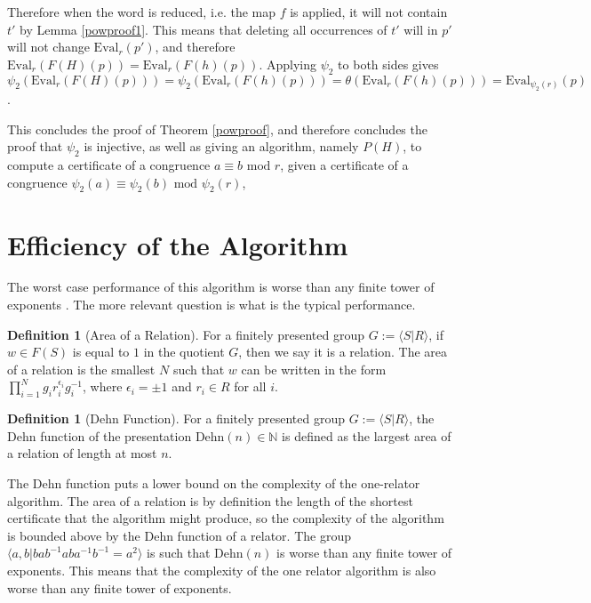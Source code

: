 \documentclass[12pt]{article} %
\theoremstyle{definition}
\theoremstyle{definition}
\theoremstyle{definition}
\theoremstyle{definition}
\newtheorem{defn}[thm]{Definition}
\begin{document}
Therefore when the word is reduced, i.e. the map $f$ is applied,
it will not contain $t'$ by Lemma \ref{powproof1}. This means that deleting all occurrences of
$t'$ will in $p'$ will not change $\text{Eval}_r(p')$, and therefore
$\text{Eval}_r(F(H)(p)) = \text{Eval}_r(F(h)(p))$.
Applying $\psi_2$ to both sides gives
$\psi_2(\text{Eval}_r(F(H)(p))) =
  \psi_2(\text{Eval}_r(F(h)(p))) =
  \theta(\text{Eval}_r(F(h)(p))) =
  \text{Eval}_{\psi_2(r)}(p)$.

  This concludes the proof of Theorem \ref{powproof}, and therefore concludes the proof
  that $\psi_2$ is injective, as well as giving an algorithm, namely $P(H)$,
  to compute a certificate of a congruence $a \equiv b \text{ mod } r$,
  given a certificate of a congruence  $\psi_2(a) \equiv \psi_2(b) \text{ mod } \psi_2(r)$,

\section{Efficiency of the Algorithm}

  The worst case performance of this algorithm is worse than any finite tower of exponents
  \cite{MYASNIKOV2011324}. The more relevant question is what is the typical performance.

  \begin{defn}[Area of a Relation]
  For a finitely presented group $G := \langle S | R\rangle$, if $w \in F(S)$ is equal
  to $1$ in the quotient $G$, then we say it is a relation.
  The area of a relation is the smallest $N$ such that $w$ can be written
  in the form $\prod_{i=1}^N g_i r_i^{\epsilon_i} g_i^{-1}$, where $\epsilon_i = \pm 1$
  and $r_i \in R$ for all $i$.
  \end{defn}

  \begin{defn}[Dehn Function]
  For a finitely presented group $G := \langle S | R\rangle$, the Dehn function
  of the presentation $\text{Dehn}(n) \in \mathbb{N}$ is defined as the
  largest area of a relation of length at most $n$.
  \end{defn}

  The Dehn function puts a lower bound on the complexity of the one-relator algorithm.
  The area of a relation is by definition the length of the shortest certificate
  that the algorithm might produce, so the complexity of the algorithm is bounded above by
  the Dehn function of a relator.
  The group $\langle a, b | b a b^{-1} a b a^{-1} b^{-1} = a^2\rangle$ is such that
  $\text{Dehn}(n)$ is worse than any finite tower of exponents. This means that the
  complexity of the one relator algorithm is also worse than any finite tower of
  exponents.
\end{document}
